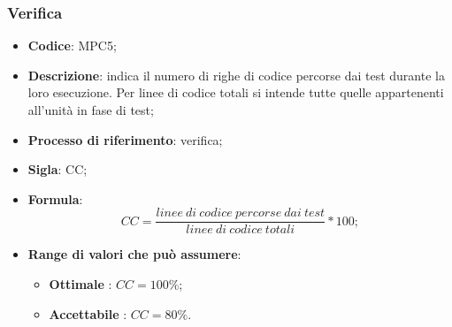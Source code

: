\subsubsection{Verifica}
\vspace{-1cm}
\begin{itemize}
	\item \textbf{Codice}: MPC5;
	\item \textbf{Descrizione}: indica il numero di righe di codice percorse dai test durante la loro
esecuzione. Per linee di codice totali si intende tutte quelle appartenenti all'unità in fase di test;
	\item \textbf{Processo di riferimento}: verifica;
	\item \textbf{Sigla}: CC;
	\item \textbf{Formula}: \[ CC = \frac{linee \ di \ codice \ percorse \ dai \ test}{linee \ di \ codice \ totali} \ast 100;\]
	\item \textbf{Range di valori che può assumere}: 
		\begin{itemize}
			\item \textbf{Ottimale} : $CC = 100 \%$;
			\item \textbf{Accettabile} : $CC = 80 \%$.
		\end{itemize}
\end{itemize}

